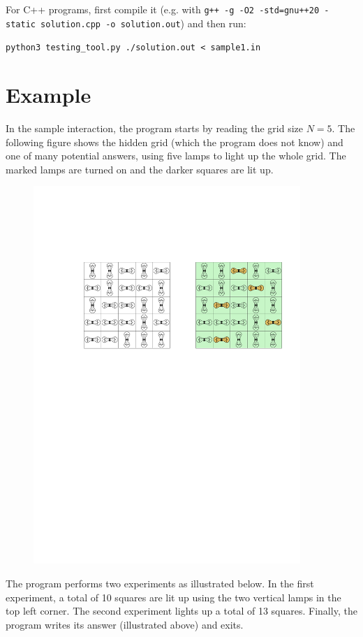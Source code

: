 \noindent
For C++ programs, first compile it
(e.g. with \verb|g++ -g -O2 -std=gnu++20 -static solution.cpp -o solution.out|)
and then run:

  \verb|python3 testing_tool.py ./solution.out < sample1.in|

\section*{Example}
In the sample interaction, the program starts by reading the grid size $N = 5$.
The following figure shows the hidden grid (which the program does not know) and one of many potential answers, using five lamps to light up the whole grid.
The marked lamps are turned on and the darker squares are lit up.

\begin{figure}
\centering
\includegraphics[width=0.9\textwidth]{fig1_4.pdf}
\end{figure}

The program performs two experiments as illustrated below. In the first
   experiment, a total of 10 squares are lit up using the two vertical lamps in the top left corner.
 The second experiment lights up a total of 13 squares.
 Finally, the program writes its answer (illustrated above) and exits.

